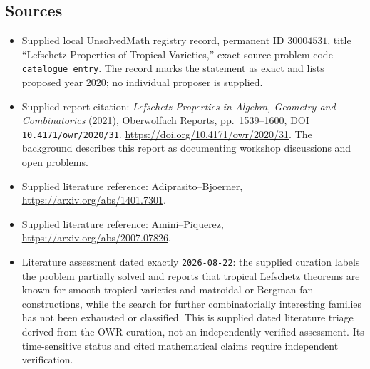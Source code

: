 \documentclass[11pt]{article}
\begin{document}
\subsection{Sources}
\begin{itemize}
\item Supplied local UnsolvedMath registry record, permanent ID \(30004531\), title ``Lefschetz Properties of Tropical Varieties,'' exact source problem code \texttt{catalogue entry}. The record marks the statement as exact and lists proposed year \(2020\); no individual proposer is supplied.
\item Supplied report citation: \emph{Lefschetz Properties in Algebra, Geometry and Combinatorics} (2021), Oberwolfach Reports, pp.\ 1539--1600, DOI \texttt{10.4171/owr/2020/31}. \url{https://doi.org/10.4171/owr/2020/31}. The background describes this report as documenting workshop discussions and open problems.
\item Supplied literature reference: Adiprasito--Bjoerner, \url{https://arxiv.org/abs/1401.7301}.
\item Supplied literature reference: Amini--Piquerez, \url{https://arxiv.org/abs/2007.07826}.
\item Literature assessment dated exactly \texttt{2026-08-22}: the supplied curation labels the problem partially solved and reports that tropical Lefschetz theorems are known for smooth tropical varieties and matroidal or Bergman-fan constructions, while the search for further combinatorially interesting families has not been exhausted or classified. This is supplied dated literature triage derived from the OWR curation, not an independently verified assessment. Its time-sensitive status and cited mathematical claims require independent verification.
\end{itemize}
\end{document}
